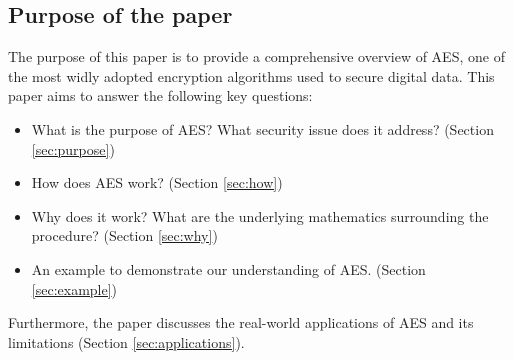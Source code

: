\subsection{Purpose of the paper}

The purpose of this paper is to provide a comprehensive overview of \gls{AES}, one of the most widly adopted encryption algorithms used to secure digital data.
This paper aims to answer the following key questions:
\begin{itemize}
    \item What is the purpose of \gls{AES}? What security issue does it address? (Section \ref{sec:purpose})
    \item How does \gls{AES} work? (Section \ref{sec:how})
    \item Why does it work? What are the underlying mathematics surrounding the procedure?  (Section \ref{sec:why})
    \item An example to demonstrate our understanding of \gls{AES}. (Section \ref{sec:example})
\end{itemize}
Furthermore, the paper discusses the real-world applications of \gls{AES} and its limitations (Section \ref{sec:applications}). 

